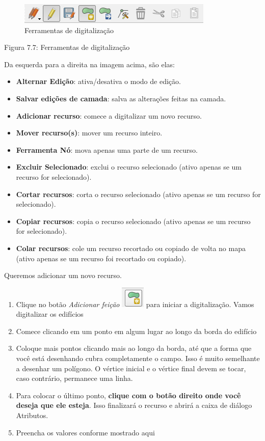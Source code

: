 \documentclass[
]{book}
\providecommand{\tightlist}{%
  \setlength{\itemsep}{0pt}\setlength{\parskip}{0pt}}
\begin{document}
\begin{figure}
\centering
\includegraphics{media/modulo7/digi-toolbar.png}
\caption{Ferramentas de digitalização}
\end{figure}

Figura 7.7: Ferramentas de digitalização

Da esquerda para a direita na imagem acima, são elas:

\begin{itemize}
\tightlist
\item
  \textbf{Alternar Edição}: ativa/desativa o modo de edição.
\item
  \textbf{Salvar edições de camada}: salva as alterações feitas na camada.
\item
  \textbf{Adicionar recurso}: comece a digitalizar um novo recurso.
\item
  \textbf{Mover recurso(s)}: mover um recurso inteiro.
\item
  \textbf{Ferramenta Nó}: mova apenas uma parte de um recurso.
\item
  \textbf{Excluir Selecionado}: exclui o recurso selecionado (ativo apenas se um recurso for selecionado).
\item
  \textbf{Cortar recursos}: corta o recurso selecionado (ativo apenas se um recurso for selecionado).
\item
  \textbf{Copiar recursos}: copia o recurso selecionado (ativo apenas se um recurso for selecionado).
\item
  \textbf{Colar recursos}: cole um recurso recortado ou copiado de volta no mapa (ativo apenas se um recurso foi recortado ou copiado).
\end{itemize}

Queremos adicionar um novo recurso.

\begin{enumerate}
\def\labelenumi{\arabic{enumi}.}
\setcounter{enumi}{10}
\tightlist
\item
  Clique no botão \emph{Adicionar feição} \includegraphics{media/modulo7/add-feature.png} para iniciar a digitalização. Vamos digitalizar os edifícios
\item
  Comece clicando em um ponto em algum lugar ao longo da borda do edifício
\item
  Coloque mais pontos clicando mais ao longo da borda, até que a forma que você está desenhando cubra completamente o campo. Isso é muito semelhante a desenhar um polígono. O vértice inicial e o vértice final devem se tocar, caso contrário, permanece uma linha.
\item
  Para colocar o último ponto, \textbf{clique com o botão direito onde você deseja que ele esteja}. Isso finalizará o recurso e abrirá a caixa de diálogo Atributos.
\item
  Preencha os valores conforme mostrado aqui
\end{enumerate}
\end{document}
